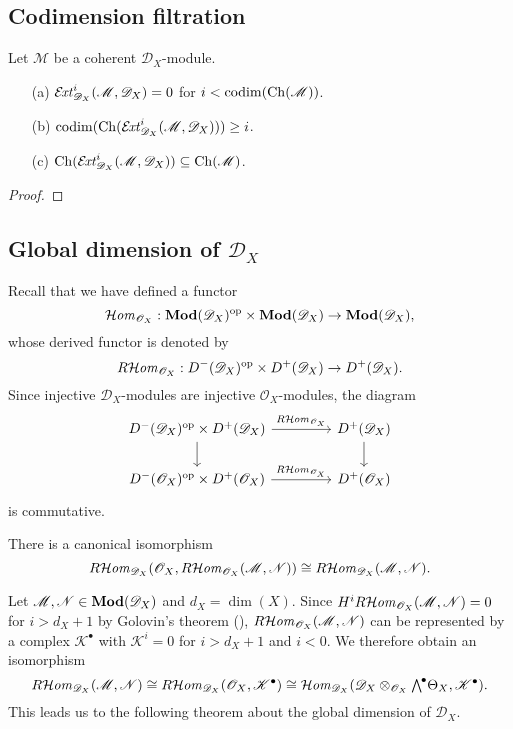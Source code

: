 \subsection{Codimension filtration}

\begin{theorem}\label{D-module sExt with D_X prop}
Let $\mathscr{M}$ be a coherent $\mathscr{D}_X$-module.
\begin{enumerate}
    \item[(a)] $\operatorname{\mathcal{E}\hspace*{-1.3pt}\textit{xt}\hspace{0.5pt}}_{\mathscr{D}_X}^i(\mathscr{M},\mathscr{D}_X)=0$ for $i<\mathrm{codim}(\mathrm{Ch}(\mathscr{M}))$.
    \item[(b)] $\mathrm{codim}(\mathrm{Ch}(\operatorname{\mathcal{E}\hspace*{-1.3pt}\textit{xt}\hspace{0.5pt}}_{\mathscr{D}_X}^i(\mathscr{M},\mathscr{D}_X)))\geq i$.
    \item[(c)] $\mathrm{Ch}(\operatorname{\mathcal{E}\hspace*{-1.3pt}\textit{xt}\hspace{0.5pt}}_{\mathscr{D}_X}^i(\mathscr{M},\mathscr{D}_X))\subseteq\mathrm{Ch}(\mathscr{M})$.
\end{enumerate}
\end{theorem}
\begin{proof}

\end{proof}

\subsection{Global dimension of \texorpdfstring{$\mathscr{D}_X$}{D}}
Recall that we have defined a functor
\[\operatorname{\mathcal{H}\hspace*{-0.4pt}\textit{om}\hspace{0.5pt}}_{\mathscr{O}_X}:\mathbf{Mod}(\mathscr{D}_X)^{\mathrm{op}}\times\mathbf{Mod}(\mathscr{D}_X)\to\mathbf{Mod}(\mathscr{D}_X),\]
whose derived functor is denoted by
\[R\!\operatorname{\mathcal{H}\hspace*{-0.4pt}\textit{om}\hspace{0.5pt}}_{\mathscr{O}_X}:D^-(\mathscr{D}_X)^{\mathrm{op}}\times D^+(\mathscr{D}_X)\to D^+(\mathscr{D}_X).\]
Since injective $\mathscr{D}_X$-modules are injective $\mathscr{O}_X$-modules, the diagram
\[\begin{tikzcd}[column sep=15mm]
D^-(\mathscr{D}_X)^{\op}\times D^+(\mathscr{D}_X)\ar[r,"R\!\sHom_{\mathscr{O}_X}"]\ar[d]&D^+(\mathscr{D}_X)\ar[d]\\
D^-(\mathscr{O}_X)^{\op}\times D^+(\mathscr{O}_X)\ar[r,"R\!\sHom_{\mathscr{O}_X}"]&D^+(\mathscr{O}_X)
\end{tikzcd}\]
is commutative.

\begin{lemma}\label{D-module derived Hom and Kronecker tensor adjoint}
There is a canonical isomorphism
\[R\!\operatorname{\mathcal{H}\hspace*{-0.4pt}\textit{om}\hspace{0.5pt}}_{\mathscr{D}_X}(\mathscr{O}_X,R\!\operatorname{\mathcal{H}\hspace*{-0.4pt}\textit{om}\hspace{0.5pt}}_{\mathscr{O}_X}(\mathscr{M},\mathscr{N}))\cong R\!\operatorname{\mathcal{H}\hspace*{-0.4pt}\textit{om}\hspace{0.5pt}}_{\mathscr{D}_X}(\mathscr{M},\mathscr{N}).\]
\end{lemma}

Let $\mathscr{M},\mathscr{N}\in\mathbf{Mod}(\mathscr{D}_X)$ and $d_X=\dim(X)$. Since $H^iR\!\operatorname{\mathcal{H}\hspace*{-0.4pt}\textit{om}\hspace{0.5pt}}_{\mathscr{O}_X}(\mathscr{M},\mathscr{N})=0$ for $i>d_X+1$ by Golovin's theorem (\cite{Golovin}), $R\!\operatorname{\mathcal{H}\hspace*{-0.4pt}\textit{om}\hspace{0.5pt}}_{\mathscr{O}_X}(\mathscr{M},\mathscr{N})$ can be represented by a complex $\mathscr{K}^\bullet$ with $\mathscr{K}^i=0$ for $i>d_X+1$ and $i<0$. We therefore obtain an isomorphism
\[R\!\sHom_{\mathscr{D}_X}(\mathscr{M},\mathscr{N})\cong R\!\sHom_{\mathscr{D}_X}(\mathscr{O}_X,\mathscr{K}^\bullet)\cong\sHom_{\mathscr{D}_X}(\mathscr{D}_X\otimes_{\mathscr{O}_X}\bigw^\bullet\Theta_X,\mathscr{K}^\bullet).\]
This leads us to the following theorem about the global dimension of $\mathscr{D}_X$.

